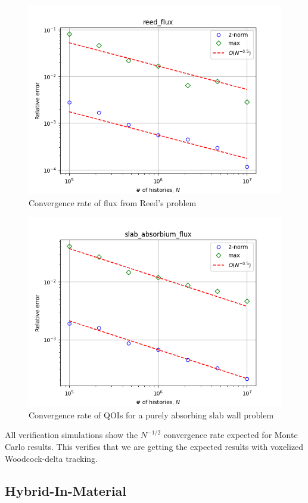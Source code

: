 \begin{figure}
  \centering
  \includegraphics[scale=0.75]{figures/delta_figs/verification/reed/reed_flux.png}
  \caption{Convergence rate of flux from Reed's problem \cite{reed_difference_1971}}
  \label{fig:reeds}
\end{figure}
\begin{figure}
    \centering
    \includegraphics[width=0.75\linewidth]{figures/delta_figs/verification/abs_slab/slab_absorbium_flux.png}
    \caption{Convergence rate of QOIs for a purely absorbing slab wall problem}
    \label{fig:abs_slab}
\end{figure}

All verification simulations show the $N^{-1/2}$ convergence rate expected for Monte Carlo results.
This verifies that we are getting the expected results with voxelized Woodcock-delta tracking.


\subsection{Hybrid-In-Material}
\label{sec:material_exc}


